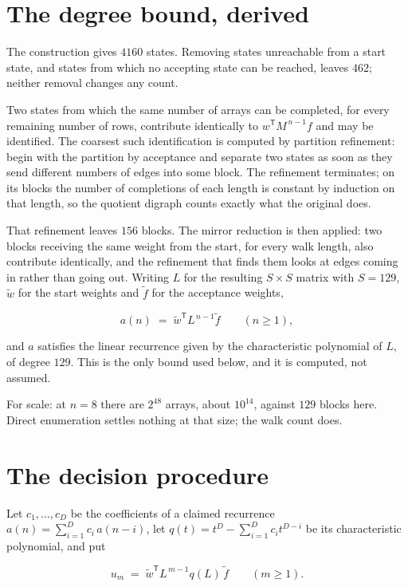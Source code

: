\documentclass[11pt]{article}
\theoremstyle{definition}
\begin{document}
\section{The degree bound, derived}

The construction gives $4160$ states. Removing states unreachable from a start state, and states from which no accepting state can be reached, leaves $462$; neither removal changes any count.

Two states from which the same number of arrays can be completed, for every remaining number of rows, contribute identically to $w^{\mathsf T}M^{\,n-1}f$ and may be identified. The coarsest such identification is computed by partition refinement: begin with the partition by acceptance and separate two states as soon as they send different numbers of edges into some block. The refinement terminates; on its blocks the number of completions of each length is constant by induction on that length, so the quotient digraph counts exactly what the original does.

That refinement leaves $156$ blocks. The mirror reduction is then applied: two blocks receiving the same weight from the start, for every walk length, also contribute identically, and the refinement that finds them looks at edges coming in rather than going out. Writing $L$ for the resulting $S \times S$ matrix with $S = 129$, $\tilde w$ for the start weights and $\tilde f$ for the acceptance weights,

\[a(n) \;=\; \tilde w^{\mathsf T} L^{\,n-1} \tilde f \qquad (n \ge 1),\]

and $a$ satisfies the linear recurrence given by the characteristic polynomial of $L$, of degree $129$. This is the only bound used below, and it is computed, not assumed.

For scale: at $n = 8$ there are $2^{48}$ arrays, about $10^{14}$, against $129$ blocks here. Direct enumeration settles nothing at that size; the walk count does.

\section{The decision procedure}

Let $c_1,\dots,c_D$ be the coefficients of a claimed recurrence $a(n) = \sum_{i=1}^{D} c_i\,a(n-i)$, let $q(t) = t^{D} - \sum_{i=1}^{D} c_i t^{D-i}$ be its characteristic polynomial, and put

\[u_m \;=\; \tilde w^{\mathsf T} L^{\,m-1} q(L)\,\tilde f \qquad (m \ge 1).\]
\end{document}
